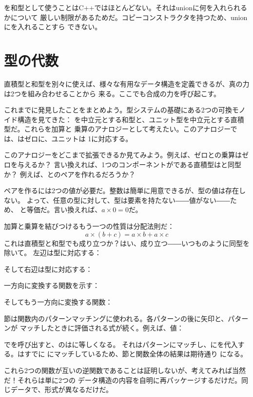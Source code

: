 を和型として使うことはC++ではほとんどない。それはunionに何を入れられるかについて
厳しい制限があるためだ。コピーコンストラクタを持つため、unionにを入れることすら
できない。

\section{型の代数}

直積型と和型を別々に使えば、様々な有用なデータ構造を定義できるが、真の力は2つを組み合わせることから
来る。ここでも合成の力を呼び起こす。

これまでに発見したことをまとめよう。型システムの基礎にある2つの可換モノイド構造を見てきた：
を中立元とする和型と、ユニット型\code{()}を中立元とする直積型だ。これらを加算と
乗算のアナロジーとして考えたい。このアナロジーでは、はゼロに、ユニット\code{()}は
1に対応する。

このアナロジーをどこまで拡張できるか見てみよう。例えば、ゼロとの乗算はゼロを与えるか？
言い換えれば、1つのコンポーネントがである直積型はと同型か？
例えば、とのペアを作れるだろうか？

ペアを作るには2つの値が必要だ。整数は簡単に用意できるが、型の値は存在しない。
よって、任意の型に対して、型は要素を持たない――値がない――ため、
と等価だ。言い換えれば、$a \times 0 = 0$だ。

加算と乗算を結びつけるもう一つの性質は分配法則だ：
\[a \times (b + c) = a \times b + a \times c\]
これは直積型と和型でも成り立つか？はい、成り立つ――いつものように同型を除いて。
左辺は型に対応する：

そして右辺は型に対応する：

一方向に変換する関数を示す：

そしてもう一方向に変換する関数：

節は関数内のパターンマッチングに使われる。各パターンの後に矢印と、パターンが
マッチしたときに評価される式が続く。例えば、値：

でを呼び出すと、のはに等しくなる。
それはパターンにマッチし、にを代入する。はすでに
にマッチしているため、節と関数全体の結果は期待通り
になる。

これら2つの関数が互いの逆関数であることは証明しないが、考えてみれば当然だ！それらは単に2つの
データ構造の内容を自明に再パッケージするだけだ。同じデータで、形式が異なるだけだ。


